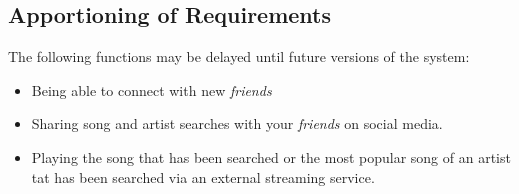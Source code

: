 \documentclass[]{article}
\begin{document}
\subsection{Apportioning of Requirements}
\label{sub:apportioning_of_requirements}
The following functions may be delayed until future versions of the system:
\begin{itemize}
	\item Being able to connect with new \textit{friends}
	\item Sharing song and artist searches with your \textit{friends} on social media.
	\item Playing the song that has been searched or the most popular song of an artist tat has been searched via an external streaming service.
\end{itemize}

\end{document}
